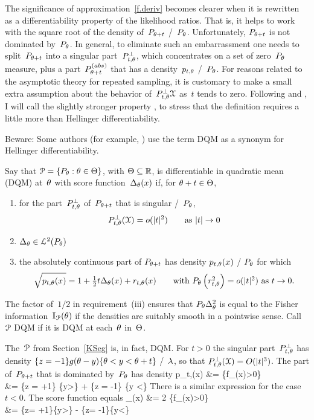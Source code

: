 \documentclass[aos]{imsart}
\begin{document}
The significance of approximation~\cref{f.deriv}  becomes clearer when it is rewritten as a differentiability property of the likelihood ratios.
That is, it helps to work with the square root of the density
of~$P_{\theta+t}$ \wrt/~$P_\theta$. Unfortunately, $P_{\theta+t}$ is not
dominated by~$P_\theta$. In general, to eliminate such an embarrassment
one needs to split~$P_{\theta+t}$ into a singular part~$P^\bot_{t,\theta}$,
which concentrates on a set of zero~$P_\theta$ measure, plus a part~$P_{\theta+t}^{(abs)}$ that
has a density~$p_{t,\theta}$ \wrt/~$P_\theta$. For reasons related to the
asymptotic theory for repeated sampling, it is customary to make a
small extra assumption about the behavior of~$P^\bot_{t,\theta}{\EuScript X}$
as~$t$ tends to zero. Following \citet[Section~17.3]{LeCam:86book} and
\citet[Section~7.2]{LeCam:Yang:2000book}, I will call the slightly
stronger property ,
to stress that the definition requires a little more than Hellinger
differentiability. 

\Remark 
Beware: Some authors (for example,
\citealt[page~457]{BKRW:93book}) use the term DQM as a synonym for
Hellinger differentiability.
\endRemark 

\Definition	\label{dqm.def}
Say that ${\EuScript P}=\{P_\theta:\theta \in \Theta\}$, with $\Theta\subseteq{\mathbb R}$, is differentiable in quadratic mean (DQM) at~$\theta$ with score function~$\Delta_\theta(x)$
  if, for $\theta+t\in\Theta$,
\begin{enumerate} 
\item
for the part~$P^\bot_{t,\theta}$ of~$P_{\theta+t}$ that is singular \wrt/~$P_\theta$,
$$
P^\bot_{t,\theta}({\EuScript X})=o(|t|^2) 
\qquad\hbox{\rm as $|t|\to0$}
$$

\item
$\Delta_\theta\in{\EuScript L}^2(P_\theta)$  

\item
the absolutely continuous part of $P_{\theta+t}$ 
has density $p_{t,\theta}(x)$ \wrt/ $P_\theta$ for which
$$
\sqrt{p_{t,\theta}(x)} = 1 + \tfrac12 t \Delta_\theta(x) + r_{t,\theta}(x)
\qquad\hbox{\rm with $P_\theta \left(r_{t,\theta}^2\right) =
o(|t|^2)$ as $t\to0$}.
$$
\end{enumerate} 


\Remark 
The factor of~$1/2$ in requirement~(iii) ensures that $P_\theta \Delta_\theta^2$ is equal to the Fisher information~${\mathbb I}_{\EuScript P}(\theta)$ if the densities are suitably smooth in a pointwise sense. 
\endRemark
Call ${\EuScript P}$  DQM if it is DQM at each~$\theta$ in~$\Theta$.
\endDefinition

The~${\EuScript P}$ from Section~\ref{KSeg} is, in fact, DQM. For $t>0$ the
singular part~$P^\bot_{t,\theta}$ has density
$\{z=-1\}g(\theta-y)\{\theta<y<\theta+t\}$ \wrt/~$\lambda$, so that
$P^\bot_{t,\theta}({\EuScript X})=O(|t|^3)$. The part of~$P_{\theta+t}$ that is
dominated by~$P_\theta$ has density
\bAlignL
p_{t,\th}(x) &= \{f_\th(x)>0\}
\notag
\\
&= \{z = +1\} \{y>\th\}
+ \{z = -1\} \{y <\th\}
\label{ptth}
\eAlignL
There is a similar expression for the case $t<0$.
The score function equals
\bAlignL
\Del_\th(x) 
&= 2 \{f_\th(x)>0\}
\notag\\
&= \{z= +1\}\{y>\th\}
- \{z= -1\}\{y<\th\}
\label{scoreP}
\eAlignL
\end{document}
